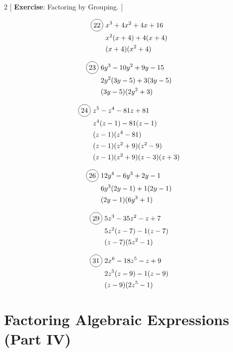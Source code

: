 \begin{multicols}{2}
[
  \textbf{Exercise}: Factoring by Grouping.
]

\begin{align*}
  \circled{22}\ &x^{3}+4x^{2}+4x+16\\
  &x^{2}(x+4)+4(x+4)\\
  &(x+4)(x^{2}+4)
\end{align*}

\begin{align*}
  \circled{23}\ &6y^{3}-10y^{2}+9y-15\\
  &2y^{2}(3y-5)+3(3y-5)\\
  &(3y-5)(2y^{2}+3)
\end{align*}

\begin{align*}
  \circled{24}\ &z^{5}-z^{4}-81z+81\\
  &z^{4}(z-1)-81(z-1)\\
  &(z-1)(z^{4}-81)\\
  &(z-1)(z^{2}+9)(z^{2}-9)\\
  &(z-1)(z^{2}+9)(z-3)(z+3)
\end{align*}

\begin{align*}
  \circled{26}\ &12y^{4}-6y^{3}+2y-1\\
  &6y^{3}(2y-1)+1(2y-1)\\
  &(2y-1)(6y^{3}+1)\\
\end{align*}

\begin{align*}
  \circled{29}\ &5z^{3}-35z^{2}-z+7\\
  &5z^{2}(z-7)-1(z-7)\\
  &(z-7)(5z^{2}-1)\\
\end{align*}

\begin{align*}
  \circled{31}\ &2x^{6}-18z^{5}-z+9\\
  &2z^{5}(z-9)-1(z-9)\\
  &(z-9)(2z^{5}-1)\\
\end{align*}
\end{multicols}

\section{Factoring Algebraic Expressions (Part IV)}

